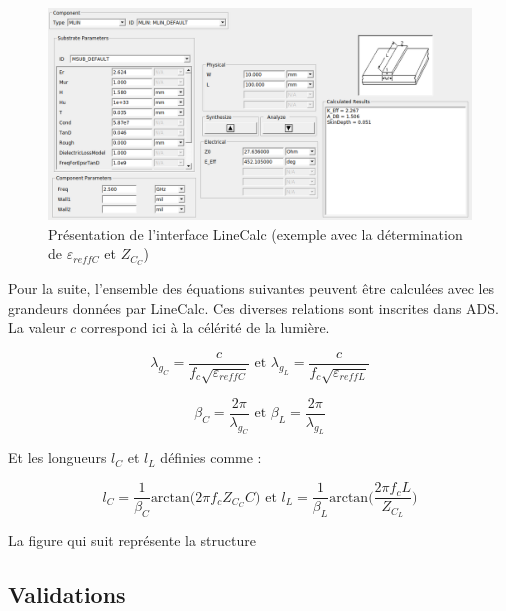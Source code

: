 \documentclass[french]{article}
\begin{document}
\begin{figure}[H]
	\centering
	\includegraphics[width=16cm]{../3synthPBas/elliptique/exemple_linecalc.png}
	\caption{Présentation de l'interface LineCalc (exemple avec la détermination de $\varepsilon_{reffC}$ et $Z_{C_C}$)}
	\label{fig:interface_linecalc}
\end{figure}

\newpage

Pour la suite, l'ensemble des équations suivantes peuvent être calculées avec les grandeurs données par LineCalc. Ces diverses relations sont inscrites dans ADS. La valeur $c$ correspond ici à la célérité de la lumière.

\begin{equation}
	\lambda_{g_C}=\frac{c}{f_c \sqrt{\varepsilon_{reffC}}} \mbox{ et } \lambda_{g_L}=\frac{c}{f_c \sqrt{\varepsilon_{reffL}}}
\end{equation}

\begin{equation}
	\beta_C = \frac{2 \pi}{\lambda_{g_C}} \mbox{ et } \beta_L = \frac{2 \pi}{\lambda_{g_L}}
\end{equation}

Et les longueurs $l_C$ et $l_L$ définies comme :

\begin{equation}
	l_C= \frac{1}{\beta_C} \mbox{arctan}\big(2 \pi f_c Z_{C_C} C\big) \mbox{ et } l_L= \frac{1}{\beta_L} \mbox{arctan}\big(\frac{2 \pi f_c L}{Z_{C_L}}\big)
\end{equation}

La figure qui suit représente la structure

\subsection*{Validations}

\newpage
\end{document}
